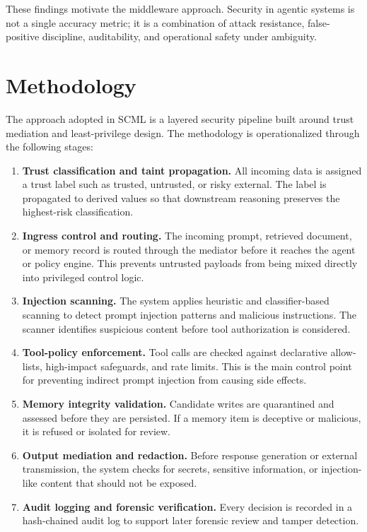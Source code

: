 \documentclass[12pt]{article}
\begin{document}
These findings motivate the middleware approach. Security in agentic systems is not a single accuracy metric; it is a combination of attack resistance, false-positive discipline, auditability, and operational safety under ambiguity.

\section{Methodology}

The approach adopted in SCML is a layered security pipeline built around trust mediation and least-privilege design. The methodology is operationalized through the following stages:

\begin{enumerate}
    \item \textbf{Trust classification and taint propagation.} All incoming data is assigned a trust label such as trusted, untrusted, or risky external. The label is propagated to derived values so that downstream reasoning preserves the highest-risk classification.
    \item \textbf{Ingress control and routing.} The incoming prompt, retrieved document, or memory record is routed through the mediator before it reaches the agent or policy engine. This prevents untrusted payloads from being mixed directly into privileged control logic.
    \item \textbf{Injection scanning.} The system applies heuristic and classifier-based scanning to detect prompt injection patterns and malicious instructions. The scanner identifies suspicious content before tool authorization is considered.
    \item \textbf{Tool-policy enforcement.} Tool calls are checked against declarative allow-lists, high-impact safeguards, and rate limits. This is the main control point for preventing indirect prompt injection from causing side effects.
    \item \textbf{Memory integrity validation.} Candidate writes are quarantined and assessed before they are persisted. If a memory item is deceptive or malicious, it is refused or isolated for review.
    \item \textbf{Output mediation and redaction.} Before response generation or external transmission, the system checks for secrets, sensitive information, or injection-like content that should not be exposed.
    \item \textbf{Audit logging and forensic verification.} Every decision is recorded in a hash-chained audit log to support later forensic review and tamper detection.
\end{enumerate}
\end{document}
